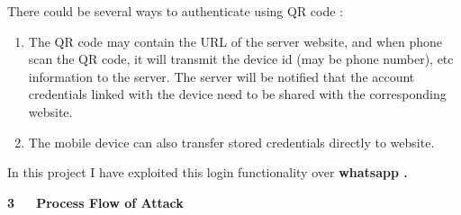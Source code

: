 \documentclass[12pt]{article}
\renewcommand{\_}{\kern-1.5pt\textunderscore\kern-1.5pt}
\begin{document}
\begin{FlushLeft}
\textcolor[HTML]{24292E}{There could be several ways to authenticate using QR code :}
\end{FlushLeft}\par

\begin{enumerate}
	\item \textcolor[HTML]{24292E}{The QR code may contain the URL of the server website, and when phone scan the QR code, it will transmit the device id (may be phone number), etc information to the server. The server will be notified that the account credentials linked with the device need to be shared with the corresponding website.}\par

	\item \textcolor[HTML]{24292E}{The mobile device can also transfer stored credentials directly to website.}
\end{enumerate}\par

\begin{FlushLeft}
In this project I have exploited this login functionality over \textbf{whatsapp .}
\end{FlushLeft}\par


\vspace{\baselineskip}

\vspace{\baselineskip}
\begin{FlushLeft}
{\fontsize{18pt}{21.6pt}\selectfont \textbf{3\ \ \  Process Flow of Attack}\par}
\end{FlushLeft}\par
\end{document}
